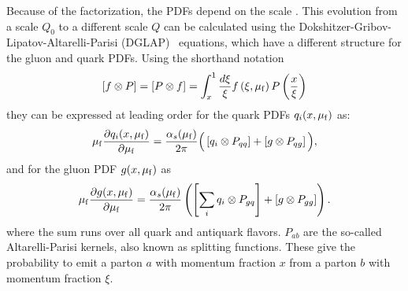 Because of the factorization, the PDFs depend on the scale \muf. This evolution
from a scale $Q_0$ to a different scale $Q$ can be calculated using the
Dokshitzer-Gribov-Lipatov-Altarelli-Parisi
(DGLAP)~\cite{Gribov:1972ri,Altarelli:1977zs,Dokshitzer:1977sg} equations, which
have a different structure for the gluon and quark PDFs. Using the shorthand notation
%
\begin{equation*}
    \left[f \otimes P \right] = \left[ P \otimes f \right] = \int_x^1 \frac{d
    \xi}{\xi} f\left(\xi, \mu_{\mathrm{f}}\right) P\left( \frac{x}{\xi} \right)
\end{equation*}
%
they can be expressed at leading order for the quark PDFs $q_i(x, \mu_{\mathrm{f}})$ as:
\begin{equation*}
    \mu_{\mathrm{f}} \frac{\partial q_i (x, \mu_{\mathrm{f}})}{\partial \mu_{\mathrm{f}}} =
    \frac{\alpha_{s}(\mu_{\mathrm{f}})}{2\pi}\Big( \left[ q_i \otimes P_{qq}
    \right] + \left[ g \otimes P_{qg} \right] \Big),
\end{equation*}
%
and for the gluon PDF $g(x, \mu_{\mathrm{f}})$ as
%
\begin{equation*}
    \mu_{\mathrm{f}} \frac{\partial g (x, \mu_{\mathrm{f}})}{\partial \mu_{\mathrm{f}}} = \frac{\alpha_{s}(\mu_{\mathrm{f}})}{2\pi}\left(\left[\sum_i  q_i \otimes P_{gq}
    \right] + \left[g \otimes P_{gg}\right] \right).
\end{equation*}
%
where the sum runs over all quark and antiquark flavors. $P_{ab}$ are the
so-called Altarelli-Parisi kernels, also known as splitting functions. These
give the probability to emit a parton $a$ with momentum fraction $x$ from a
parton $b$ with momentum fraction $\xi$.


